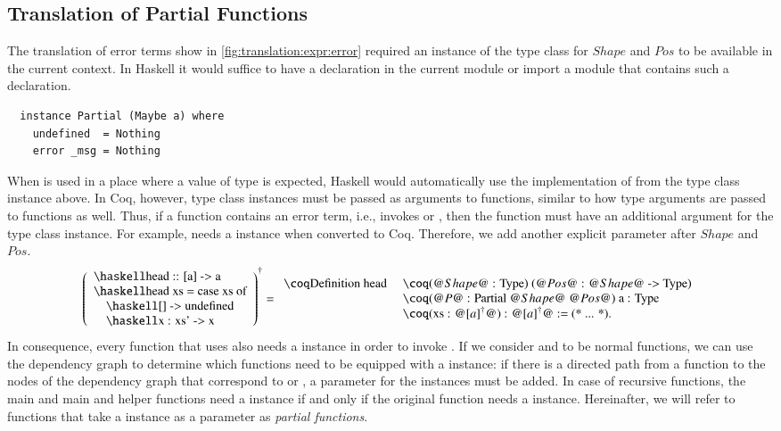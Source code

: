 \subsection{Translation of Partial Functions}
The translation of error terms show in \autoref{fig:translation:expr:error} required an instance of the  type class for $Shape$ and $Pos$ to be available in the current context.
In Haskell it would suffice to have a  declaration in the current module or import a module that contains such a declaration.
\begin{verbatim}
  instance Partial (Maybe a) where
    undefined  = Nothing
    error _msg = Nothing
\end{verbatim}
When  is used in a place where a value of type  is expected, Haskell would automatically use the implementation of  from the type class instance above.
In Coq, however, type class instances must be passed as arguments to functions, similar to how type arguments are passed to functions as well.
Thus, if a function contains an error term, i.e., invokes  or , then the function must have an additional argument for the  type class instance.
For example,  needs a  instance when converted to Coq.
Therefore, we add another explicit parameter after $Shape$ and $Pos$.
\[
  \toCoq{\left(\begin{array}{l}
    \haskellM{head :: [a] -> a}           \\
    \haskellM{head xs = case xs of}       \\
    \quad\haskellM{[]      -> undefined} \\
    \quad\haskellM{x : xs' -> x}         \\
  \end{array}\right)}
  = \begin{array}{ll}
    \coqM{Definition head}\;
      &\coqM{(@$\Shape$@ : Type) (@$\Pos$@ : @$\Shape$@ -> Type)} \\
      &\coqM{(@$P$@ : Partial @$\Shape$@ @$\Pos$@) {a : Type}}    \\
      &\coqM{(xs : @$\toCoqX{[a]}$@) : @$\toCoqX{[a]}$@ := (* ... *).}
  \end{array}
\]
In consequence, every function that uses  also needs a  instance in order to invoke .
If we consider  and  to be normal functions, we can use the dependency graph to determine which functions need to be equipped with a  instance: if there is a directed path from a function to the nodes of the dependency graph that correspond to  or , a parameter for the  instances must be added.
In case of recursive functions, the main and main and helper functions need a  instance if and only if the original function needs a  instance.
Hereinafter, we will refer to functions that take a  instance as a parameter as \textit{partial functions}.

